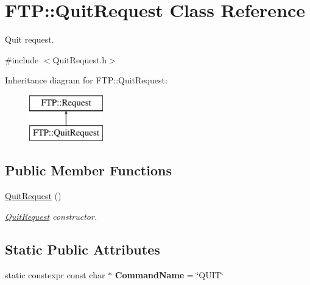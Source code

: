 \hypertarget{classFTP_1_1QuitRequest}{}\section{F\+T\+P\+:\+:Quit\+Request Class Reference}
\label{classFTP_1_1QuitRequest}


Quit request.  




{\ttfamily \#include $<$Quit\+Request.\+h$>$}

Inheritance diagram for F\+T\+P\+:\+:Quit\+Request\+:\begin{figure}[H]
\begin{center}
\leavevmode
\includegraphics[height=2.000000cm]{classFTP_1_1QuitRequest}
\end{center}
\end{figure}
\subsection*{Public Member Functions}
\begin{DoxyCompactItemize}
\item 
\hypertarget{classFTP_1_1QuitRequest_ac4485b43c00501183cea0eaea01e7349}{}\hyperlink{classFTP_1_1QuitRequest_ac4485b43c00501183cea0eaea01e7349}{Quit\+Request} ()\label{classFTP_1_1QuitRequest_ac4485b43c00501183cea0eaea01e7349}

\begin{DoxyCompactList}\small\item\em \hyperlink{classFTP_1_1QuitRequest}{Quit\+Request} constructor. \end{DoxyCompactList}\end{DoxyCompactItemize}
\subsection*{Static Public Attributes}
\begin{DoxyCompactItemize}
\item 
\hypertarget{classFTP_1_1QuitRequest_ad454c5249faa90ecec425af2ca5a6405}{}static constexpr const char $\ast$ {\bfseries Command\+Name} = \char`\"{}Q\+U\+I\+T\char`\"{}\label{classFTP_1_1QuitRequest_ad454c5249faa90ecec425af2ca5a6405}

\end{DoxyCompactItemize}


